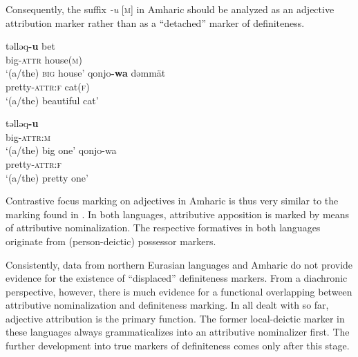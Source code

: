 {Consequently, the suffix \textit{-u} [\textsc{m}] in Amharic should be analyzed as an adjective attribution marker rather than as a “detached” marker of definiteness. 
\begin{exe}
\ex	{}
\begin{xlist}
\begin{xlist}
\ex
\gll	təlləq\textbf{-u} bet\\
	big-\textsc{attr} house(\textsc{m})\\
\glt	‘(a/the) \textsc{big} house’
\ex	
\gll	qonjo\textbf{-wa} dəmmät\\
	pretty-\textsc{attr:f} cat(\textsc{f})\\
\glt	‘(a/the) beautiful cat’
\end{xlist}
\begin{xlist}
\ex
\gll	təlləq\textbf{-u}\\
	big-\textsc{attr:m}\\
\glt	‘(a/the) big one’
\ex	
\gll	qonjo-wa\\
	pretty-\textsc{attr:f}\\
\glt	‘(a/the) pretty one’
\end{xlist}
\end{xlist}
\end{exe}

Contrastive focus marking on adjectives in Amharic is thus very similar to the marking found in . In both languages, attributive apposition is marked by means of attributive nominalization. The respective formatives in both languages originate from (person-deictic) possessor markers.

Consistently, data from northern Eurasian languages and Amharic do not provide evidence for the existence of “displaced” definiteness markers. From a diachronic perspective, however, there is much evidence for a functional overlapping between attributive nominalization and definiteness marking. In all  dealt with so far, adjective attribution is the primary function. The former local-deictic marker in these languages always grammaticalizes into an attributive nominalizer first. The further development into true markers of definiteness comes only after this stage.

}
